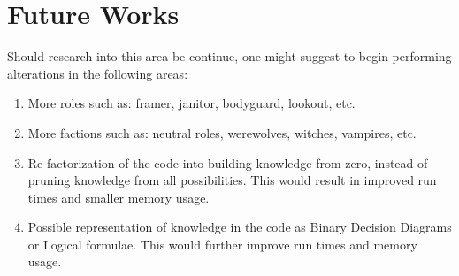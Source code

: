 \section{Future Works}\label{sec:future-works}
Should research into this area be continue, one might suggest to begin 
performing alterations in the following areas:
\begin{enumerate}
	\item More roles such as: framer, janitor, bodyguard, lookout, etc.
	\item More factions such as: neutral roles, werewolves, witches, vampires, 
	etc.
	\item Re-factorization of the code into building knowledge from zero, 
	instead of pruning knowledge from all possibilities. This would result in 
	improved run times and smaller memory usage. 
	\item Possible representation of knowledge in the code as Binary Decision 
	Diagrams or Logical formulae. This would further improve run times and 
	memory usage. 
\end{enumerate}